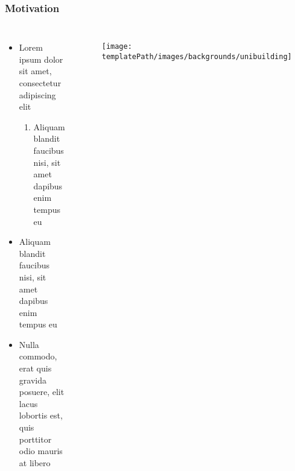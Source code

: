 \begin{frame}
	\frametitle{Motivation}
	
	\begin{columns}[c]
		
		
		\begin{itemize}
			\item Lorem ipsum dolor sit amet, consectetur adipiscing elit
			\begin{enumerate}
				\item Aliquam blandit faucibus nisi, sit amet dapibus enim tempus eu
			\end{enumerate}
			\item Aliquam blandit faucibus nisi, sit amet dapibus enim tempus eu
			\item Nulla commodo, erat quis gravida posuere, elit lacus lobortis est, quis porttitor odio mauris at libero
		\end{itemize}
		
		\begin{figure}
			\texttt{[image: \\templatePath/images/backgrounds/unibuilding]}
		\end{figure}
		
		
	\end{columns}
	
\end{frame}